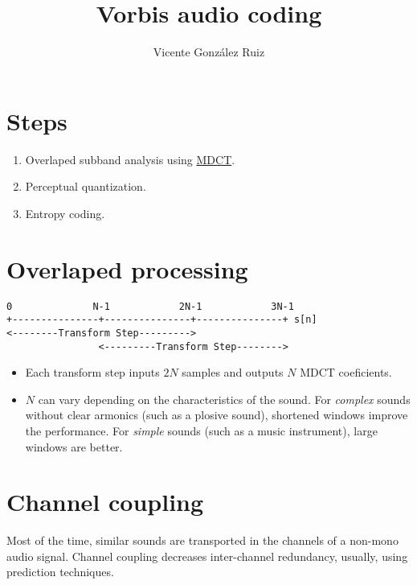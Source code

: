 
\title{Vorbis audio coding}

\author{Vicente González Ruiz}

\maketitle

\section{Steps}
\begin{enumerate}
\def\labelenumi{\arabic{enumi}.}
\tightlist
\item
  Overlaped subband analysis using
  \href{http://en.wikipedia.org/wiki/Modified_discrete_cosine_transform}{MDCT}.
\item
  Perceptual quantization.
\item
  Entropy coding.
\end{enumerate}

\section{Overlaped processing}
\begin{verbatim}
0              N-1            2N-1            3N-1
+---------------+---------------+---------------+ s[n]
<--------Transform Step--------->
                <---------Transform Step-------->
\end{verbatim}

\begin{itemize}
\item
  Each transform step inputs \(2N\) samples and outputs \(N\) MDCT
  coeficients.
\item
  \(N\) can vary depending on the characteristics of the sound. For
  \emph{complex} sounds without clear armonics (such as a plosive
  sound), shortened windows improve the performance. For \emph{simple}
  sounds (such as a music instrument), large windows are better.
\end{itemize}

\section{Channel coupling}
Most of the time, similar sounds are transported in the channels of a
non-mono audio signal. Channel coupling decreases inter-channel
redundancy, usually, using prediction techniques.

